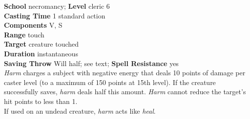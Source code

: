 \textbf{School} necromancy; \textbf{Level} cleric 6\\
\textbf{Casting Time} 1 standard action\\
\textbf{Components} V, S\\
\textbf{Range} touch\\
\textbf{Target} creature touched\\
\textbf{Duration} instantaneous\\
\textbf{Saving Throw }Will half; see text; \textbf{Spell Resistance} yes\\
\textit{Harm }charges a subject with negative energy that deals 10 points of damage per caster level (to a maximum of 150 points at 15th level). If the creature successfully saves, \textit{harm }deals half this amount. \textit{Harm} cannot reduce the target's hit points to less than 1.\\
If used on an undead creature, \textit{harm }acts like \textit{heal}.\\
